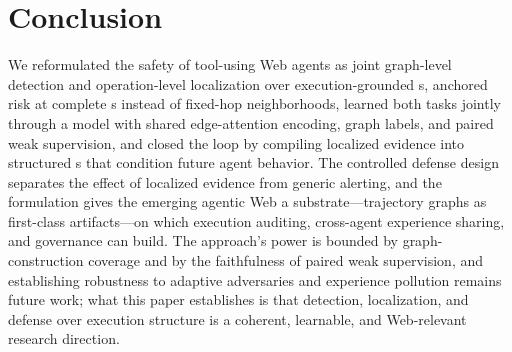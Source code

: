\section{Conclusion}
We reformulated the safety of tool-using Web agents as joint graph-level detection and operation-level localization over execution-grounded \stg{}s, anchored risk at complete \aeu{}s instead of fixed-hop neighborhoods, learned both tasks jointly through a \csmil{} model with shared edge-attention encoding, graph labels, and paired weak supervision, and closed the loop by compiling localized evidence into structured \sexp{}s that condition future agent behavior. The controlled defense design separates the effect of localized evidence from generic alerting, and the formulation gives the emerging agentic Web a substrate---trajectory graphs as first-class artifacts---on which execution auditing, cross-agent experience sharing, and governance can build. The approach's power is bounded by graph-construction coverage and by the faithfulness of paired weak supervision, and establishing robustness to adaptive adversaries and experience pollution remains future work; what this paper establishes is that detection, localization, and defense over execution structure is a coherent, learnable, and Web-relevant research direction.